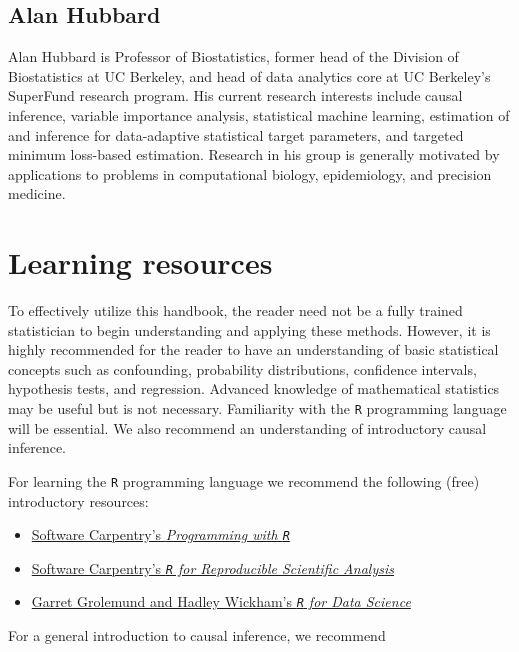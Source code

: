 \documentclass[12pt, krantz2,]{book}
\providecommand{\tightlist}{%
  \setlength{\itemsep}{0pt}\setlength{\parskip}{0pt}}
\theoremstyle{definition}
\theoremstyle{definition}
\theoremstyle{definition}
\newcommand{\1}{\mathbbm{1}}
\begin{document}
\hypertarget{alan-hubbard}{%
\subsection*{Alan Hubbard}\label{alan-hubbard}}


Alan Hubbard is Professor of Biostatistics, former head of the Division of
Biostatistics at UC Berkeley, and head of data analytics core at UC Berkeley's
SuperFund research program. His current research interests include causal
inference, variable importance analysis, statistical machine learning,
estimation of and inference for data-adaptive statistical target parameters, and
targeted minimum loss-based estimation. Research in his group is generally
motivated by applications to problems in computational biology, epidemiology,
and precision medicine.

\hypertarget{learn}{%
\section{Learning resources}\label{learn}}

To effectively utilize this handbook, the reader need not be a fully trained
statistician to begin understanding and applying these methods. However, it is
highly recommended for the reader to have an understanding of basic statistical
concepts such as confounding, probability distributions, confidence intervals,
hypothesis tests, and regression. Advanced knowledge of mathematical statistics
may be useful but is not necessary. Familiarity with the \texttt{R} programming
language will be essential. We also recommend an understanding of introductory
causal inference.

For learning the \texttt{R} programming language we recommend the following (free)
introductory resources:

\begin{itemize}
\tightlist
\item
  \href{http://swcarpentry.github.io/r-novice-inflammation/}{Software Carpentry's \emph{Programming with
  \texttt{R}}}
\item
  \href{http://swcarpentry.github.io/r-novice-gapminder/}{Software Carpentry's \emph{\texttt{R} for Reproducible Scientific
  Analysis}}
\item
  \href{https://r4ds.had.co.nz}{Garret Grolemund and Hadley Wickham's \emph{\texttt{R} for Data
  Science}}
\end{itemize}

For a general introduction to causal inference, we recommend
\end{document}
